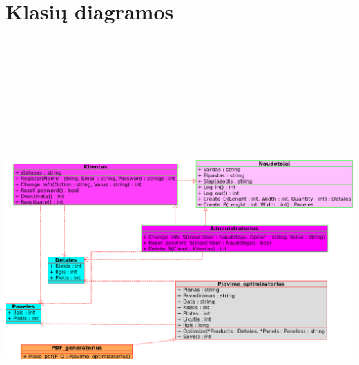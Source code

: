 \documentclass[a4paper,12pt]{article}
\begin{document}
\clearpage

\section{Klasių diagramos}


\begin{frame}
\centering
\hspace{-1cm}
\includegraphics[width=18cm, height=17cm]{class_diagram.png}
\end{frame}

\clearpage
\end{document}
